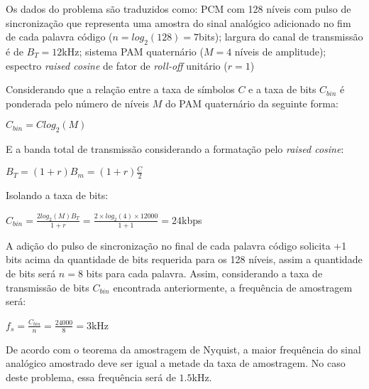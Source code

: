 Os dados do problema são traduzidos como: PCM com 128 níveis com pulso de sincronização que representa uma amostra do sinal analógico adicionado no fim de cada palavra código ($n = log_2(128) =7$bits); largura do canal de transmissão é de $B_T=12$kHz; sistema PAM quaternário ($M=4$ níveis de amplitude); espectro \textit{raised cosine} de fator  de \textit{roll-off} unitário ($r=1$)
\begin{subquestion}
    \item Considerando que a relação entre a taxa de símbolos $C$ e a taxa de bits $C_{bin}$ é ponderada pelo número de níveis $M$ do PAM quaternário da seguinte forma:
    \begin{center}
        $C_{bin} = C log_2(M)$
    \end{center}
    E a banda total de transmissão considerando a formatação pelo \textit{raised cosine}:
    \begin{center}
        $B_T = (1+r)B_m = (1+r)\frac{C}{2}$
    \end{center}
    Isolando a taxa de bits:
    \begin{center}
        $C_{bin} = \frac{2 log_2(M) B_T}{1+r} = \frac{2 \times log_2(4) \times 12000}{1+1} = 24$kbps
    \end{center}
    
    \item A adição do pulso de sincronização no final de cada palavra código solicita +1 bits acima da quantidade de bits requerida para os 128 níveis, assim a quantidade de bits será $n=8$ bits para cada palavra. Assim, considerando a taxa de transmissão de bits $C_{bin}$ encontrada anteriormente, a frequência de amostragem será:
    \begin{center}
        $f_s = \frac{C_{bin}}{n} = \frac{24000}{8} = 3$kHz
    \end{center}
    
    De acordo com o teorema da amostragem de Nyquist, a maior frequência do sinal analógico amostrado deve ser igual a metade da taxa de amostragem. No caso deste problema, essa frequência será de $1.5$kHz.
\end{subquestion}
\newpage